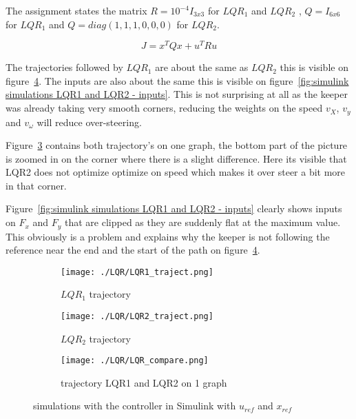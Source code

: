 The assignment states the matrix $R=10^{-4} I_{3x3}$ for $LQR_1$ and $LQR_2$ , $Q=I_{6x6}$ for $LQR_1$ and $Q=diag(1,1,1,0,0,0)$ for $LQR_2$.

\begin{equation}
	J=x^TQx + u^TRu
\end{equation}

The trajectories followed by $LQR_1$ are about the same as $LQR_2$ this is visible on  figure~\ref{fig:simulink simulations LQR1 and LQR2 - trajects}. The inputs are also about the same this is visible on figure~\ref{fig:simulink simulations LQR1 and LQR2 - inputs}. This is not surprising at all as the keeper was already taking very smooth corners, reducing the weights on the speed $v_X$, $v_y$ and $v_{\omega}$ will reduce over-steering. 


Figure~\ref{fig:trajectory LQR1 and LQR2 on 1 graph} contains both trajectory's on one graph, the bottom part of the picture is zoomed in on the corner where there is a slight difference. Here its visible that LQR2 does not optimize optimize on speed which makes it over steer a bit more in that corner. 

Figure~\ref{fig:simulink simulations LQR1 and LQR2 - inputs} clearly shows inputs on $F_x$ and $F_y$ that are clipped as they are suddenly flat at the maximum value. This obviously is a problem and explains why the keeper is not following the reference near the end and the start of the path on figure~\ref{fig:simulink simulations LQR1 and LQR2 - trajects}. 

\begin{figure}[H]
	\centering
	\begin{subfigure}[b]{0.45\textwidth}
		\texttt{[image: ./LQR/LQR1\_traject.png]}
		\caption{$LQR_1$ trajectory}
		\label{fig:LQR1 traject}
	\end{subfigure}
	\begin{subfigure}[b]{0.45\textwidth}
		\texttt{[image: ./LQR/LQR2\_traject.png]}
		\caption{$LQR_2$ trajectory}
		\label{fig:LQR2 traject}
	\end{subfigure}
	\begin{subfigure}[b]{0.55\textwidth}
		\texttt{[image: ./LQR/LQR\_compare.png]}
		\caption{trajectory LQR1 and LQR2 on 1 graph}
		\label{fig:trajectory LQR1 and LQR2 on 1 graph}
	\end{subfigure}
	\caption{simulations with the controller in Simulink with $u_{ref}$ and $x_{ref}$}
	\label{fig:simulink simulations LQR1 and LQR2 - trajects}
\end{figure}


